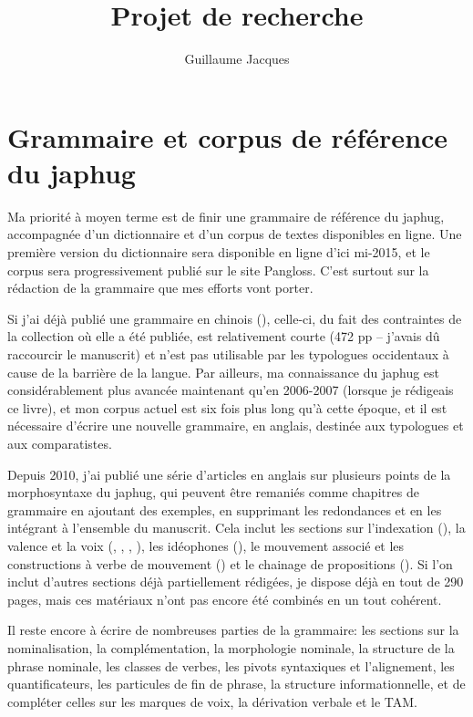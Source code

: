 \documentclass[oldfontcommands,oneside,a4paper,11pt]{article}
\begin{document}
\title{Projet de recherche}
\author{Guillaume Jacques}
\maketitle

\sloppy
\tableofcontents
\section{Grammaire et corpus de référence du japhug}
Ma priorité à moyen terme est de finir une grammaire de référence du japhug, accompagnée d'un dictionnaire et d'un corpus de textes disponibles en ligne. Une première version du dictionnaire sera disponible en ligne d'ici mi-2015, et le corpus sera progressivement publié sur le site Pangloss. C'est surtout sur la rédaction de la grammaire que mes efforts vont porter.

Si j'ai déjà publié une grammaire en chinois (\citealt{jacques08zh}), celle-ci, du fait des contraintes de la collection où elle a été publiée, est relativement courte (472 pp -- j'avais dû raccourcir le manuscrit) et n'est pas utilisable par les typologues occidentaux à cause de la barrière de la langue. Par ailleurs, ma connaissance du japhug est considérablement plus avancée maintenant qu'en 2006-2007 (lorsque je rédigeais ce livre), et mon corpus actuel est six fois plus long qu'à cette époque, et il est nécessaire d'écrire une nouvelle grammaire, en anglais, destinée aux typologues et aux comparatistes.

Depuis 2010, j'ai publié une série d'articles en anglais sur plusieurs points de la morphosyntaxe du japhug, qui peuvent être remaniés comme chapitres de grammaire en ajoutant des exemples, en supprimant les redondances et en les intégrant à l'ensemble du manuscrit. Cela inclut les sections sur l'indexation (\citealt{jacques10inverse}), la valence et la voix (\citealt{jacques12demotion}, \citealt{jacques12incorp}, \citealt{jacques13tropative},   \citealt{jacques14antipassive}), les idéophones (\citealt{japhug14ideophones}), le mouvement associé et les constructions à verbe de mouvement (\citealt{jacques13harmonization}) et le chainage de propositions (\citealt{jacques14linking}). Si l'on inclut d'autres sections déjà partiellement rédigées, je dispose déjà en tout de 290 pages, mais ces matériaux n'ont pas encore été combinés en un  tout cohérent.

Il reste encore à écrire de nombreuses parties de la grammaire: les sections sur la nominalisation, la complémentation, la morphologie nominale, la structure de la phrase nominale, les classes de verbes, les pivots syntaxiques et l'alignement, les quantificateurs, les particules de fin de phrase, la structure informationnelle, et de compléter celles sur les marques de voix, la dérivation verbale et le TAM.
\end{document}
